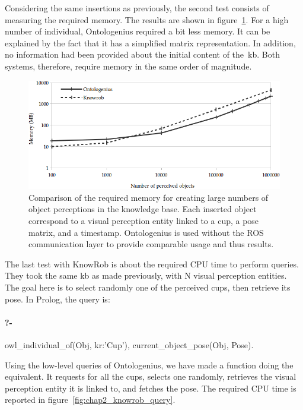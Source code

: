 Considering the same insertions as previously, the second test consists of measuring the required memory. The results are shown in figure~\ref{fig:chap2_knowrob_memory}. For a high number of individual, Ontologenius required a bit less memory. It can be explained by the fact that it has a simplified matrix representation. In addition, no information had been provided about the initial content of the~\acrshort{kb}. Both systems, therefore, require memory in the same order of magnitude.

\begin{figure}[ht!]
\centering
\includegraphics[width=\textwidth]{figures/chapter2/knowrob/Memory.png}
\caption{\label{fig:chap2_knowrob_memory} Comparison of the required memory for creating large numbers of object perceptions in the knowledge base. Each inserted object correspond to a visual perception entity linked to a cup, a pose matrix, and a timestamp. Ontologenius is used without the ROS communication layer to provide comparable usage and thus results.}
\end{figure}

The last test with KnowRob is about the required CPU time to perform queries. They took the same \acrshort{kb} as made previously, with N visual perception entities. The goal here is to select randomly one of the perceived cups, then retrieve its pose. In Prolog, the query is:

\paragraph{?-} owl\_individual\_of(Obj, kr:’Cup’), current\_object\_pose(Obj, Pose).

Using the low-level queries of Ontologenius, we have made a function doing the equivalent. It requests for all the cups, selects one randomly, retrieves the visual perception entity it is linked to, and fetches the pose. The required CPU time is reported in figure~\ref{fig:chap2_knowrob_query}.


